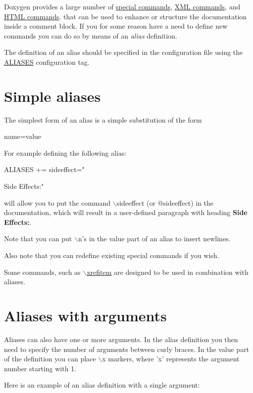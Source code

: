 Doxygen provides a large number of \hyperlink{commands}{special commands}, \hyperlink{xmlcmds}{XML commands}, and \hyperlink{htmlcmds}{HTML commands}. that can be used to enhance or structure the documentation inside a comment block. If you for some reason have a need to define new commands you can do so by means of an {\itshape alias\/} definition.

The definition of an alias should be specified in the configuration file using the \hyperlink{config_cfg_aliases}{ALIASES} configuration tag.\hypertarget{custcmd_custcmd_simple}{}\section{Simple aliases}\label{custcmd_custcmd_simple}
The simplest form of an alias is a simple substitution of the form \begin{DoxyVerb}
 name=value
\end{DoxyVerb}
 For example defining the following alias: \begin{DoxyVerb}
 ALIASES += sideeffect="\par Side Effects:\n" 
\end{DoxyVerb}
 will allow you to put the command $\backslash$sideeffect (or @sideeffect) in the documentation, which will result in a user-\/defined paragraph with heading {\bfseries Side Effects:}.

Note that you can put $\backslash$n's in the value part of an alias to insert newlines.

Also note that you can redefine existing special commands if you wish.

Some commands, such as \hyperlink{commands_cmdxrefitem}{$\backslash$xrefitem} are designed to be used in combination with aliases.\hypertarget{custcmd_custcmd_complex}{}\section{Aliases with arguments}\label{custcmd_custcmd_complex}
Aliases can also have one or more arguments. In the alias definition you then need to specify the number of arguments between curly braces. In the value part of the definition you can place $\backslash$x markers, where 'x' represents the argument number starting with 1.

Here is an example of an alias definition with a single argument: 


